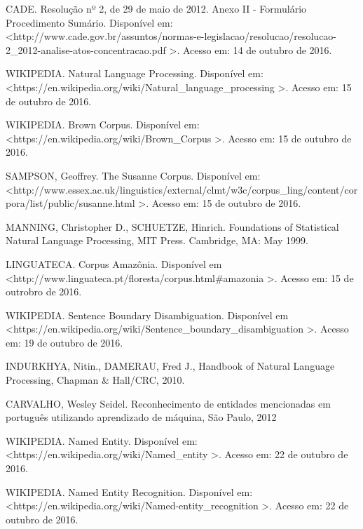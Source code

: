 \documentclass[11pt]{report}
\begin{document}
\begin{enumerate}[label={[\arabic*]}]
\item CADE. Resolução nº 2, de 29 de maio de 2012. Anexo II - Formulário Procedimento Sumário. Disponível em: \newline\textless\enspace http://www.cade.gov.br/assuntos/normas-e-legislacao/resolucao/resolucao-2\_2012-analise-atos-concentracao.pdf \enspace\textgreater. Acesso em: 14 de outubro de 2016.
\item WIKIPEDIA. Natural Language Processing. Disponível em: \newline\textless\enspace https://en.wikipedia.org/wiki/Natural\_language\_processing \enspace\textgreater. Acesso em: 15 de outubro de 2016.
\item WIKIPEDIA. Brown Corpus. Disponível em: \textless\enspace https://en.wikipedia.org/wiki/Brown\_Corpus \enspace\textgreater. Acesso em: 15 de outubro de 2016.
\item SAMPSON, Geoffrey. The Susanne Corpus. Disponível em: \newline\textless\enspace http://www.essex.ac.uk/linguistics/external/clmt/w3c/corpus\_ling/content/\newline corpora/list/public/susanne.html \enspace\textgreater. Acesso em: 15 de outubro de 2016.
\item MANNING, Christopher D., SCHUETZE, Hinrich. Foundations of Statistical Natural Language Processing, MIT Press. Cambridge, MA: May 1999.
\item LINGUATECA. Corpus Amazônia. Disponível em \textless\enspace http://www.linguateca.pt/floresta/\newline corpus.html\#amazonia \enspace\textgreater. Acesso em: 15 de outrobro de 2016.
\item WIKIPEDIA. Sentence Boundary Disambiguation. Disponível em \newline\textless\enspace https://en.wikipedia.org/wiki/Sentence\_boundary\_disambiguation \enspace\textgreater. Acesso em: 19 de outubro de 2016.
\item INDURKHYA, Nitin., DAMERAU, Fred J., Handbook of Natural Language Processing, Chapman \& Hall/CRC, 2010.
\item CARVALHO, Wesley Seidel. Reconhecimento de entidades mencionadas em português utilizando aprendizado de máquina, São Paulo, 2012
\item WIKIPEDIA. Named Entity. Disponível em: \newline\textless\enspace https://en.wikipedia.org/wiki/Named\_entity \enspace\textgreater. Acesso em: 22 de outubro de 2016.
\item WIKIPEDIA. Named Entity Recognition. Disponível em: \newline\textless\enspace https://en.wikipedia.org/wiki/Named-entity\_recognition \enspace\textgreater. Acesso em: 22 de outubro de 2016.

\end{enumerate}
\end{document}
